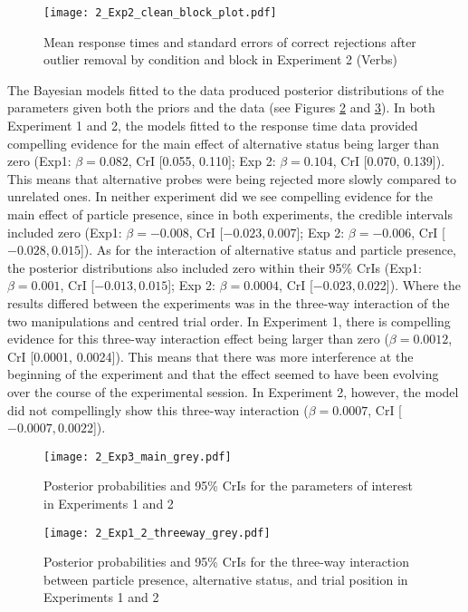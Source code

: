 \documentclass[output=paper,colorlinks,citecolor=brown]{langscibook}
\begin{document}
\begin{figure}[p]
\texttt{[image: 2\_Exp2\_clean\_block\_plot.pdf]}
\caption{Mean response times and standard errors of correct rejections after outlier removal by condition and block in Experiment 2 (Verbs)}
\label{fig:fig2}
\end{figure}

The Bayesian models fitted to the data produced posterior distributions of the parameters given both the priors and the data (see Figures  \ref{fig:fig3} and \ref{fig:fig4}). In both Experiment 1 and 2, the models fitted to the response time data provided compelling evidence for the main effect of alternative status being larger than zero (Exp1: $\beta = 0.082$, CrI [0.055, 0.110]; Exp 2: $\beta = 0.104$, CrI [0.070, 0.139]). This means that alternative probes were being rejected more slowly compared to unrelated ones. In neither experiment did we see compelling evidence for the main effect of particle presence, since in both experiments, the credible intervals included zero (Exp1: $\beta = -0.008$, CrI [$-0.023, 0.007$]; Exp 2: $\beta = -0.006$, CrI [$-0.028, 0.015$]). As for the interaction of alternative status and particle presence, the posterior distributions also included zero within their 95\% CrIs (Exp1: $\beta = 0.001$, CrI [$-0.013, 0.015$]; Exp 2: $\beta = 0.0004$, CrI [$-0.023, 0.022$]). Where the results differed between the experiments was in the three-way interaction of the two manipulations and centred trial order. In Experiment 1, there is compelling evidence for this three-way interaction effect being larger than zero ($\beta = 0.0012$, CrI [0.0001, 0.0024]). This means that there was more interference at the beginning of the experiment and that the effect seemed to have been evolving over the course of the experimental session. In Experiment 2, however, the model did not compellingly show this three-way interaction ($\beta = 0.0007$, CrI [$-0.0007, 0.0022$]).

\begin{figure}[p]
\texttt{[image: 2\_Exp3\_main\_grey.pdf]}
\caption{Posterior probabilities and 95\% CrIs for the parameters of interest in Experiments 1 and 2}
\label{fig:fig3}
\end{figure}

\begin{figure}[p]
\texttt{[image: 2\_Exp1\_2\_threeway\_grey.pdf]}
\caption{Posterior probabilities and 95\% CrIs for the three-way interaction between particle presence, alternative status, and trial position in Experiments 1 and 2}
\label{fig:fig4}
\end{figure}
\end{document}
